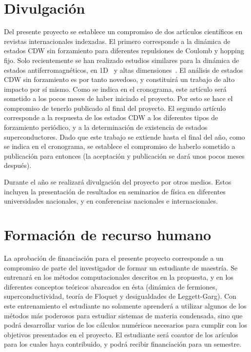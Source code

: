 \documentclass[a4paper,10pt]{article}
\begin{document}
\section{Divulgaci\'on}
Del presente proyecto se establece un compromiso de dos art\'iculos cient\'ificos en revistas internacionales indexadas. El primero corresponde a la din\'amica de estados CDW sin forzamiento para diferentes repulsiones de Coulomb y hopping fijo. Solo recientemente se han realizado estudios similares para la din\'amica de estados antiferromagn\'eticos, en 1D~\cite{heidrich_meisner2015pra} y altas dimensiones~\cite{balzer2015prx,nosotros2017driven}. El an\'alisis de estados CDW sin forzamiento es por tanto novedoso, y constituir\'a un trabajo de alto impacto por s\'i mismo. Como se indica en el cronograma, este art\'iculo ser\'a sometido a los pocos meses de haber iniciado el proyecto. Por esto se hace el compromiso de tenerlo publicado al final del proyecto. El segundo art\'iculo corresponde a la respuesta de los estados CDW a los diferentes tipos de forzamiento peri\'odico, y a la determinaci\'on de existencia de estados superconductores. Dado que este trabajo se extiende hasta el final del a\~no, como se indica en el cronograma, se establece el compromiso de haberlo sometido a publicaci\'on para entonces (la aceptaci\'on y publicaci\'on se dar\'a unos pocos meses despu\'es). 

Durante el a\~no se realizar\'a divulgaci\'on del proyecto por otros medios. Estos incluyen la presentaci\'on de resultados en seminarios de f\'isica en diferentes universidades nacionales, y en conferencias nacionales e internacionales.

\section{Formaci\'on de recurso humano}
La aprobaci\'on de financiaci\'on para el presente proyecto corresponde a un compromiso de parte del investigador de formar un estudiante de maestr\'ia. Se entrenar\'a en los m\'etodos computacionales descritos en la propuesta, y en los diferentes conceptos te\'oricos abarcados en \'esta (din\'amica de fermiones, superconductividad, teor\'ia de Floquet y desigualdades de Leggett-Garg). Con este entrenamiento el estudiante no solamente aprender\'a a utilizar algunos de los m\'etodos m\'as poderosos para estudiar sistemas de materia condensada, sino que podr\'a desarrollar varios de los c\'alculos num\'ericos necesarios para cumplir con los objetivos presentados en el proyecto. El estudiante ser\'a coautor de los ar\'iculos para los cuales haya contribuido, y podr\'a recibir financiaci\'on para un semestre.    
\end{document}
